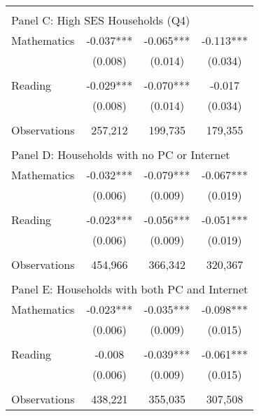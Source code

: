 {\begin{tabular}{lccc}
&  &  &   \\
\multicolumn{4}{l}{Panel C: High SES Households (Q4)} \\
Mathematics         &      -0.037***&      -0.065***&      -0.113***\\
                    &     (0.008)   &     (0.014)   &     (0.034)   \\
 
&  &  &   \\
Reading             &      -0.029***&      -0.070***&      -0.017   \\
                    &     (0.008)   &     (0.014)   &     (0.034)   \\
                    &               &               &               \\
Observations        &     257,212   &     199,735   &     179,355   \\
 
&  &  &   \\
\multicolumn{4}{l}{Panel D: Households with no PC or Internet} \\
Mathematics         &      -0.032***&      -0.079***&      -0.067***\\
                    &     (0.006)   &     (0.009)   &     (0.019)   \\
 
&  &  &   \\
Reading             &      -0.023***&      -0.056***&      -0.051***\\
                    &     (0.006)   &     (0.009)   &     (0.019)   \\
                    &               &               &               \\
Observations        &     454,966   &     366,342   &     320,367   \\
 
&  &  &   \\
\multicolumn{4}{l}{Panel E: Households with both PC and Internet} \\
Mathematics         &      -0.023***&      -0.035***&      -0.098***\\
                    &     (0.006)   &     (0.009)   &     (0.015)   \\
 
&  &  &   \\
Reading             &      -0.008   &      -0.039***&      -0.061***\\
                    &     (0.006)   &     (0.009)   &     (0.015)   \\
                    &               &               &               \\
Observations        &     438,221   &     355,035   &     307,508   \\
 

\bottomrule
\end{tabular}
}

